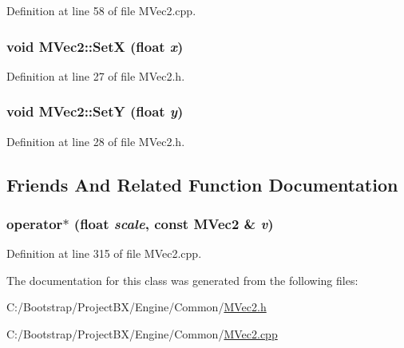 Definition at line 58 of file MVec2.cpp.\hypertarget{class_m_vec2_9cd1d6d7fdb7548c0498fb35b729fd38}{
\subsubsection[{SetX}]{\setlength{\rightskip}{0pt plus 5cm}void MVec2::SetX (float {\em x})}}
\label{class_m_vec2_9cd1d6d7fdb7548c0498fb35b729fd38}




Definition at line 27 of file MVec2.h.\hypertarget{class_m_vec2_476159d9ad1d7392ba93ca2924e8b3a0}{
\subsubsection[{SetY}]{\setlength{\rightskip}{0pt plus 5cm}void MVec2::SetY (float {\em y})}}
\label{class_m_vec2_476159d9ad1d7392ba93ca2924e8b3a0}




Definition at line 28 of file MVec2.h.

\subsection{Friends And Related Function Documentation}
\hypertarget{class_m_vec2_ed5cee556a30023d584efef3dd83a306}{
\subsubsection[{operator$\ast$}]{ operator$\ast$ (float {\em scale}, \/  const {\bf MVec2} \& {\em v})}}
\label{class_m_vec2_ed5cee556a30023d584efef3dd83a306}




Definition at line 315 of file MVec2.cpp.

The documentation for this class was generated from the following files:\begin{CompactItemize}
\item 
C:/Bootstrap/ProjectBX/Engine/Common/\hyperlink{_m_vec2_8h}{MVec2.h}\item 
C:/Bootstrap/ProjectBX/Engine/Common/\hyperlink{_m_vec2_8cpp}{MVec2.cpp}\end{CompactItemize}
